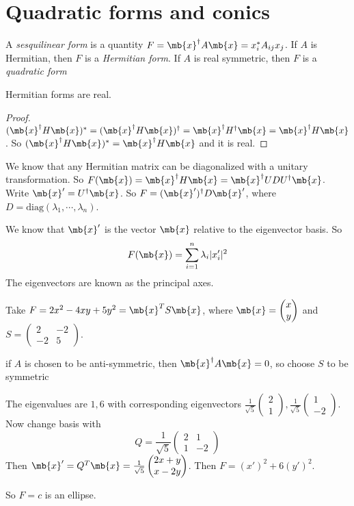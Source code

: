 \documentclass[a4paper]{article}
\begin{document}
\section{Quadratic forms and conics}
\begin{defi}
  A \emph{sesquilinear form} is a quantity $F = \mb{x}^\dagger A\mb{x} = x_i^*A_{ij}x_j$. If $A$ is Hermitian, then $F$ is a \emph{Hermitian form}. If $A$ is real symmetric, then $F$ is a \emph{quadratic form}
\end{defi}

\begin{thm}
  Hermitian forms are real.
\end{thm}
\begin{proof}
  $(\mb{x}^\dagger H\mb{x})^* = (\mb{x}^\dagger H\mb{x})^\dagger = \mb{x}^\dagger H^\dagger\mb{x} = \mb{x}^\dagger H\mb{x}$. So $(\mb{x}^\dagger H\mb{x})^* = \mb{x}^\dagger H\mb{x}$ and it is real.
\end{proof}

We know that any Hermitian matrix can be diagonalized with a unitary transformation. So $F(\mb{x}) = \mb{x}^\dagger H\mb{x} = \mb{x}^\dagger UDU^\dagger \mb{x}$. Write $\mb{x}' = U^\dagger \mb{x}$. So $F = (\mb{x}')^\dagger D\mb{x}'$, where $D = \mathrm{diag}(\lambda_1,\cdots,\lambda_n)$.

We know that $\mb{x}'$ is the vector $\mb{x}$ relative to the eigenvector basis. So 
\[
F(\mb{x}) = \sum_{i = 1}^n \lambda_i |x_i'|^2
\]
The eigenvectors are known as the principal axes.

\begin{eg}
  Take $F = 2x^2 - 4xy + 5y^2 = \mb{x}^TS\mb{x}$, where $\mb{x} = 
  \begin{pmatrix}
    x\\y
  \end{pmatrix}$ and $S = 
  \begin{pmatrix}
    2 & -2\\
    -2 & 5
  \end{pmatrix}$.

  \note if $A$ is chosen to be anti-symmetric, then $\mb{x}^\dagger A\mb{x} = 0$, so choose $S$ to be symmetric

  The eigenvalues are $1, 6$ with corresponding eigenvectors $
  \displaystyle \frac{1}{\sqrt{5}}\begin{pmatrix}
    2\\1
  \end{pmatrix},\frac{1}{\sqrt{5}}
  \begin{pmatrix}
    1\\-2
  \end{pmatrix}$. Now change basis with
  \[
  Q = \frac{1}{\sqrt{5}}
  \begin{pmatrix}
    2 & 1\\
    1 & -2
  \end{pmatrix}
  \]
  Then $\mb{x}' = Q^T\mb{x} =
  \frac{1}{\sqrt{5}}\begin{pmatrix}
    2x + y\\x - 2y
  \end{pmatrix}$. Then $F = (x')^2 + 6(y')^2$.

  So $F = c$ is an ellipse.
\end{eg}
\end{document}
